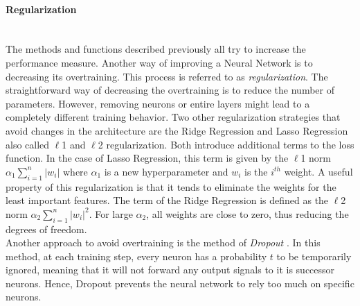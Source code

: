 \paragraph{Regularization} \mbox{} \\
\label{sec:regularization}
The methods and functions described previously all try to increase the performance measure. Another way of improving a Neural Network is to decreasing its overtraining. This process is referred to as \textit{regularization}. The straightforward way of decreasing the overtraining is to reduce the number of parameters. However, removing neurons or entire layers might lead to a completely different training behavior. Two other regularization strategies that avoid changes in the architecture are the Ridge Regression \cite{rigde} and Lasso Regression \cite{lasso} also called $\ell$1 and $\ell$2 regularization. Both introduce additional terms to the loss function. In the case of  Lasso Regression, this term is given by the $\ell$1 norm $\alpha_1 \sum_{i=1}^{n} |w_i|$ where $\alpha_1$ is a new hyperparameter and $w_i$ is the $i^{th}$ weight. A useful property of this regularization is that it tends to eliminate the weights for the least important features. The term of the Ridge Regression is defined as the $\ell$2 norm $\alpha_2 \sum_{i=1}^{n} |w_i|^2$. For large $\alpha_2$, all weights are close to zero, thus reducing the degrees of freedom. \\
Another approach to avoid overtraining is the method of \textit{Dropout} \cite{dropout}. In this method, at each training step, every neuron has a probability $t$ to be temporarily ignored, meaning that it will not forward any output signals to it is successor neurons. Hence, Dropout prevents the neural network to rely too much on specific neurons.
